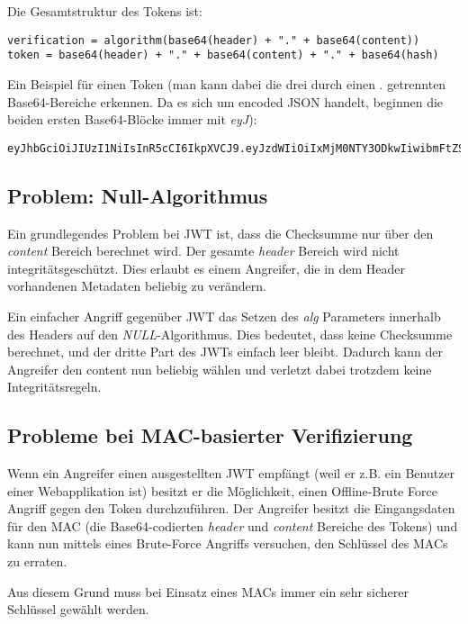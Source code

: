 Die Gesamtstruktur des Tokens ist:

\begin{verbatim}
verification = algorithm(base64(header) + "." + base64(content))
token = base64(header) + "." + base64(content) + "." + base64(hash)
\end{verbatim}

Ein Beispiel für einen Token (man kann dabei die drei durch einen . getrennten Base64-Bereiche erkennen. Da es sich um encoded JSON handelt, beginnen die beiden ersten Base64-Blöcke immer mit \textit{eyJ}):

\begin{verbatim}
eyJhbGciOiJIUzI1NiIsInR5cCI6IkpXVCJ9.eyJzdWIiOiIxMjM0NTY3ODkwIiwibmFtZSI6IkpvaG4gRG9lIiwiaWF0IjoxNTE2MjM5MDIyfQ.SflKxwRJSMeKKF2QT4fwpMeJf36POk6yJV_adQssw5c
\end{verbatim}

\subsection{Problem: Null-Algorithmus}

Ein grundlegendes Problem bei JWT ist, dass die Checksumme nur über den \textit{content} Bereich berechnet wird. Der gesamte \textit{header} Bereich wird nicht integritätsgeschützt. Dies erlaubt es einem Angreifer, die in dem Header vorhandenen Metadaten beliebig zu verändern.

Ein einfacher Angriff gegenüber JWT das Setzen des \textit{alg} Parameters innerhalb des Headers auf den \textit{NULL}-Algorithmus. Dies bedeutet, dass keine Checksumme berechnet, und der dritte Part des JWTs einfach leer bleibt. Dadurch kann der Angreifer den content nun beliebig wählen und verletzt dabei trotzdem keine Integritätsregeln.

\subsection{Probleme bei MAC-basierter Verifizierung}

Wenn ein Angreifer einen ausgestellten JWT empfängt (weil er z.B. ein Benutzer einer Webapplikation ist) besitzt er die Möglichkeit, einen Offline-Brute Force Angriff gegen den Token durchzuführen. Der Angreifer besitzt die Eingangsdaten für den MAC (die Base64-codierten \textit{header} und \textit{content} Bereiche des Tokens) und kann nun mittels eines Brute-Force Angriffs versuchen, den Schlüssel des MACs zu erraten.

Aus diesem Grund muss bei Einsatz eines MACs immer ein sehr sicherer Schlüssel gewählt werden.


